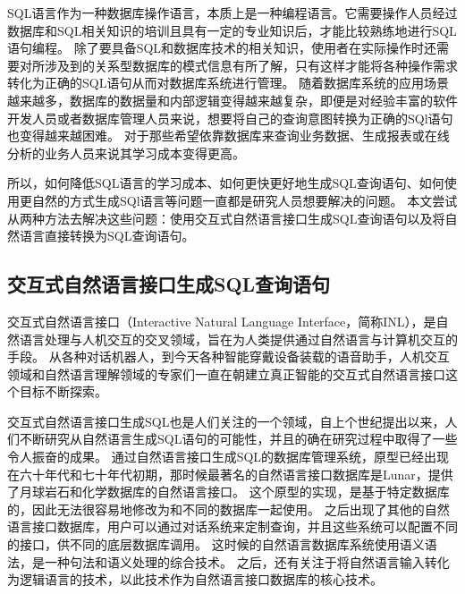 SQL语言作为一种数据库操作语言，本质上是一种编程语言。它需要操作人员经过数据库和SQL相关知识的培训且具有一定的专业知识后，才能比较熟练地进行SQL语句编程。
除了要具备SQL和数据库技术的相关知识，使用者在实际操作时还需要对所涉及到的关系型数据库的模式信息有所了解，只有这样才能将各种操作需求转化为正确的SQL语句从而对数据库系统进行管理。
随着数据库系统的应用场景越来越多，数据库的数据量和内部逻辑变得越来越复杂，即便是对经验丰富的软件开发人员或者数据库管理人员来说，想要将自己的查询意图转换为正确的SQl语句也变得越来越困难。
对于那些希望依靠数据库来查询业务数据、生成报表或在线分析的业务人员来说其学习成本变得更高。

所以，如何降低SQL语言的学习成本、如何更快更好地生成SQL查询语句、如何使用更自然的方式生成SQl语言等问题一直都是研究人员想要解决的问题。
本文尝试从两种方法去解决这些问题：使用交互式自然语言接口生成SQL查询语句以及将自然语言直接转换为SQL查询语句。

\subsection{交互式自然语言接口生成SQL查询语句}
\label{intro:nli2sql}
交互式自然语言接口（Interactive Natural Language Interface，简称INL），是自然语言处理与人机交互的交叉领域，旨在为人类提供通过自然语言与计算机交互的手段。
从各种对话机器人，到今天各种智能穿戴设备装载的语音助手，人机交互领域和自然语言理解领域的专家们一直在朝建立真正智能的交互式自然语言接口这个目标不断探索。

交互式自然语言接口生成SQL\cite{Androutsopoulos1995Natural}也是人们关注的一个领域，自上个世纪提出以来，人们不断研究从自然语言生成SQL语句的可能性，并且的确在研究过程中取得了一些令人振奋的成果。
通过自然语言接口生成SQL的数据库管理系统，原型已经出现在六十年代和七十年代初期，那时候最著名的自然语言接口数据库是Lunar\cite{woods1972lunar}，提供了月球岩石和化学数据库的自然语言接口。
这个原型的实现，是基于特定数据库的，因此无法很容易地修改为和不同的数据库一起使用。
之后出现了其他的自然语言接口数据库，用户可以通过对话系统来定制查询，并且这些系统可以配置不同的接口，供不同的底层数据库调用\cite{wallace1984communicating}。
这时候的自然语言数据库系统使用语义语法，是一种句法和语义处理的综合技术。
之后，还有关注于将自然语言输入转化为逻辑语言\cite{alshawi1992core}的技术，以此技术作为自然语言接口数据库的核心技术。

